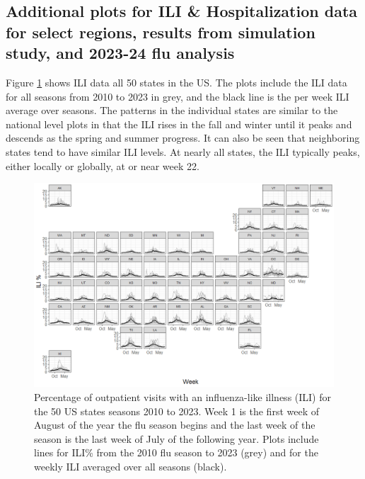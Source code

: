 \documentclass[ba]{imsart}
\theoremstyle{plain}
\theoremstyle{definition}
\theoremstyle{remark}
\begin{document}
\begin{supplement}
\renewcommand{\thesection}{\Alph{section}}

\section{Additional plots for ILI \& Hospitalization data for select regions,
         results from simulation study, and 2023-24 flu analysis}

Figure \ref{fig:ili_vs_week} shows ILI data all 50 states in the US. 
The plots include the ILI data for all seasons from 2010 to 2023 in grey, 
and the black line is the per week ILI average over seasons. 
The patterns in the individual states are similar to the national 
level plots in that the ILI rises in the fall and winter until it peaks 
and descends as the spring and summer progress. 
It can also be seen that neighboring states tend to have similar ILI levels.
At nearly all states, the ILI typically peaks, either locally or globally, 
at or near 
week 22. 

 \begin{figure}[hbt!]
    \centering
    \includegraphics[scale=.45]{Images/ili_vs_week.png}
    \caption{Percentage of outpatient visits with an influenza-like illness 
    (ILI) for the 50 US states seasons 2010 to 2023. Week 1 is the first week 
    of August of the year the flu season begins and the last week of the 
    season is the last week of July of the following year.
     Plots include lines for ILI\% from the 2010 flu season to 2023 (grey) 
     and for the weekly ILI averaged over all seasons (black).}
    \label{fig:ili_vs_week}
\end{figure}



\end{supplement}
\end{document}
